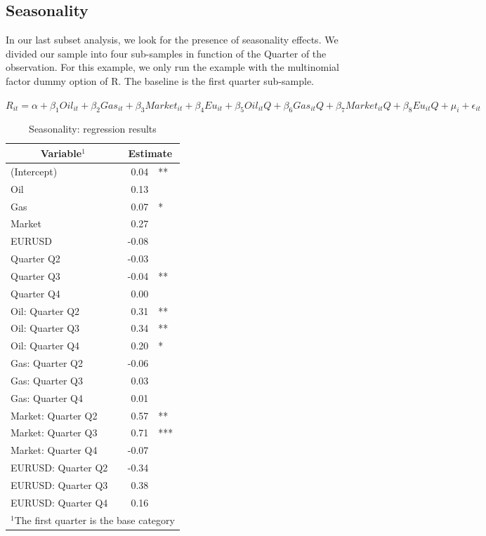 \documentclass[a4paper]{article}
\begin{document}
\subsection{Seasonality}

In our last subset analysis, we look for the presence of seasonality effects. 
We divided our sample into four sub-samples in function of the Quarter of the observation. For this example, we only run the example with the multinomial factor dummy option of R. The baseline is the first quarter sub-sample.

$R_{it} = \alpha + \beta_{1} Oil_{it} + \beta_{2} Gas_{it} + \beta_{3} Market_{it} + \beta_{4} Eu_{it} + \beta_{5} Oil_{it}Q + \beta_{6} Gas_{it}Q +\beta_{7}Market_{it}Q + \beta_{8}Eu_{it}Q+ \mu_{i} + \epsilon_{it}$

\begin{table}[ht]
\centering
\begin{tabular}{l|rl}
\hline
\hline
\multicolumn{1}{c|}{Variable$^{1}$} & \multicolumn{2}{c}{Estimate} \\
\hline
(Intercept) & 0.04 & ** \\
Oil & 0.13 & \\
Gas & 0.07 & * \\
Market & 0.27 & \\
EURUSD & -0.08 & \\
Quarter Q2 & -0.03 & \\
Quarter Q3 & -0.04 & ** \\
Quarter Q4 & 0.00 & \\
Oil: Quarter Q2 & 0.31 & ** \\
Oil: Quarter Q3 & 0.34 & ** \\
Oil: Quarter Q4 & 0.20 & * \\
Gas: Quarter Q2 & -0.06 & \\
Gas: Quarter Q3 & 0.03 & \\
Gas: Quarter Q4 & 0.01 & \\
Market: Quarter Q2 & 0.57 & ** \\
Market: Quarter Q3 & 0.71 & *** \\
Market: Quarter Q4 & -0.07 & \\
EURUSD: Quarter Q2 & -0.34 & \\
EURUSD: Quarter Q3 & 0.38 & \\
EURUSD: Quarter Q4 & 0.16 & \\
\hline
\hline
\multicolumn{3}{l}{\footnotesize $^{1}$The first quarter is the base category} \\
\end{tabular}
\label{}
\caption{Seasonality: regression results}

\end{table}
\end{document}
